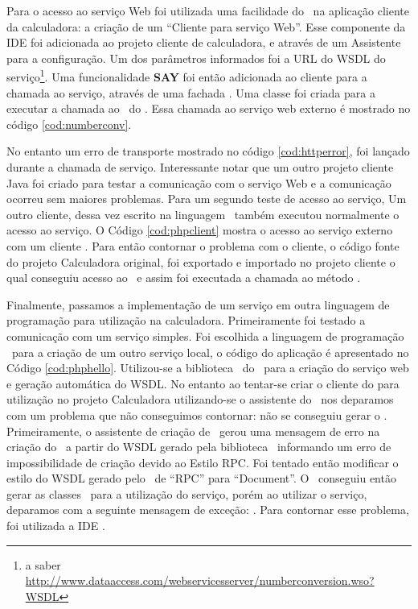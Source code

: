 Para o acesso ao serviço Web foi utilizada uma facilidade do \NetBeans\ na
aplicação cliente da calculadora: a criação de um ``Cliente para serviço Web''.
Esse componente da IDE foi adicionada ao projeto cliente de calculadora, e
através de um Assistente para a configuração. Um dos parâmetros informados foi a
URL do WSDL do serviço\footnote{a saber
\url{http://www.dataaccess.com/webservicesserver/numberconversion.wso?WSDL}}. Uma
funcionalidade \textbf{SAY} foi então adicionada ao cliente para a chamada ao
serviço, através de uma fachada . Uma
classe  foi criada para a executar a chamada ao
\proxy\ do \WebService. Essa chamada ao serviço web externo é mostrado no código
\ref{cod:numberconv}.

No entanto um erro de transporte mostrado no código \ref{cod:httperror}, foi
lançado durante a chamada de serviço. Interessante notar que um outro projeto
cliente Java foi criado para testar a comunicação com o serviço Web
 e a comunicação ocorreu sem maiores problemas.
Para um segundo teste de acesso ao serviço, Um outro cliente, dessa vez escrito
na linguagem \php\, também executou normalmente o acesso ao serviço. O Código
\ref{cod:phpclient} mostra o acesso ao serviço externo com um cliente \php. Para
então contornar o problema com o cliente, o código fonte do projeto Calculadora
original, foi exportado e importado no projeto cliente o qual conseguiu acesso
ao \WebService\ e assim foi executada a chamada ao método .

Finalmente, passamos a implementação de um serviço em outra linguagem de
programação para utilização na calculadora. Primeiramente foi testado a
comunicação com um serviço  simples. Foi escolhida a
linguagem de programação \PHP\ para a criação de um outro serviço local, o
código do aplicação  é apresentado no Código
\ref{cod:phphello}. Utilizou-se a biblioteca \NuSOAPv\ do \PHP\ para a criação do
serviço web e geração automática do WSDL. No entanto ao tentar-se criar o
cliente do \WebService para utilização no projeto Calculadora utilizando-se o
assistente do \NetBeans\ nos deparamos com um problema que não conseguimos
contornar: não se conseguiu gerar o  . Primeiramente, o
assistente de criação de \proxy\ gerou uma mensagem de erro na criação do
\WebService\ a partir do WSDL gerado pela biblioteca \NuSOAP\ informando um
erro de impossibilidade de criação devido ao Estilo RPC. Foi tentado então
modificar o estilo do WSDL gerado pelo \NuSOAP\ de ``RPC'' para ``Document''. O
\NetBeans\ conseguiu então gerar as classes \proxy\ para a utilização do
serviço, porém ao utilizar o serviço, deparamos com a seguinte mensagem de
exceção: . Para contornar esse problema, foi utilizada a IDE \Eclipsev.

